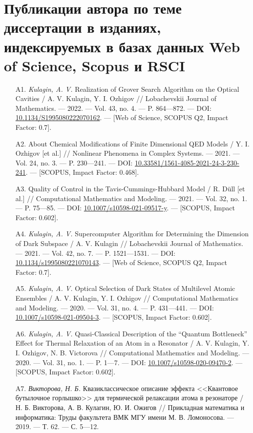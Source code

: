 \clearpage

\chapter*{
	Публикации автора по теме диссертации в изданиях, индексируемых в базах данных Web of Science, Scopus и RSCI
}
\vspace{-1em}
\hypersetup{urlcolor=blue}
{\seminormalsize
\begin{itemize}[leftmargin=24pt]
	\item[A1.]{\textit{Kulagin, A. V.} Realization of Grover Search Algorithm on the Opti­cal Cavities / A. V. Kulagin, Y. I. Ozhigov // Lobachevskii Journal of Mathematics. — 2022. — Vol. 43, no. 4. — P. 864—872. — DOI: \href{https://doi.org/10.1134/S1995080222070162}{10.1134/S1995080222070162}. — [Web of Science, SCOPUS Q2, Impact Factor: 0.7].}
	\item[A2.]{About Chemical Modifications of Finite Dimensional QED Models / Y. I. Ozhigov [et al.] // Nonlinear Phenomena in Complex Systems. — 2021. — Vol. 24, no. 3. — P. 230—241. — DOI: \href{https://doi.org/10.33581/1561-4085-2021-24-3-230-241}{10.33581/1561-4085-2021-24-3-230-241}. — [SCOPUS, Impact Factor: 0.468].}
	\item[A3.]{Quality of Control in the Tavis-Cummings-Hubbard Model / R. Düll [et al.] // Computational Mathematics and Modeling. — 2021. — Vol. 32, no. 1. — P. 75—85. — DOI: \href{https://doi.org/10.1007/s10598-021-09517-y}{10.1007/s10598-021-09517-y}. — [SCOPUS, Impact Factor: 0.602].}
	\item[A4.]{\textit{Kulagin, A. V.} Supercomputer Algorithm for Determining the Dimension of Dark Subspace / A. V. Kulagin // Lobachevskii Journal of Mathemat­ics. — 2021. — Vol. 42, no. 7. — P. 1521—1531. — DOI: \href{https://doi.org/10.1134/s1995080221070143}{10.1134/s1995080221070143}. — [Web of Science, SCOPUS Q2, Impact Factor: 0.7].}
	\item[A5.]{\textit{Kulagin, A. V.} Optical Selection of Dark States of Multilevel Atomic Ensembles / A. V. Kulagin, Y. I. Ozhigov // Computational Mathematics and Modeling. — 2020. — Vol. 31, no. 4. — P. 431—441. — DOI: \href{https://doi.org/10.1007/s10598-021-09504-3}{10.1007/s10598-021-09504-3}. — [SCOPUS, Impact Factor: 0.602].}
	\item[A6.]{\textit{Kulagin, A. V.} Quasi-Classical Description of the ``Quantum Bottleneck'' Effect for Thermal Relaxation of an Atom in a Resonator / A. V. Kulagin, Y. I. Ozhigov, N. B. Victorova // Computational Mathematics and Mod­eling. — 2020. — Vol. 31, no. 1. — P. 1—7. — DOI: \href{https://doi.org/10.1007/s10598-020-09470-2}{10.1007/s10598-020-09470-2}. — [SCOPUS, Impact Factor: 0.602].}
	\item[A7.]{\textit{Викторова, Н. Б.} Квазиклассическое описание эффекта <<Квантовое бутылочное горлышко>> для термической релаксации атома в резона­торе / Н. Б. Викторова, А. В. Кулагин, Ю. И. Ожигов // Прикладная математика и информатика: Труды факультета ВМК МГУ имени М. В. Ломоносова. — 2019. — Т. 62. — С. 5—12.}
\end{itemize}
}
